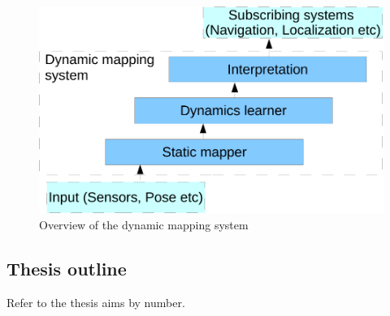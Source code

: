 \begin{figure} [htbp]
	\centering
	\includegraphics[scale=0.7]{chapters/introduction/figures/system-overview}
	\caption{Overview of the dynamic mapping system}
	\label{fig:block-overview}
\end{figure}

\subsection{Thesis outline}
Refer to the thesis aims by number.



